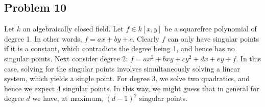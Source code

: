 \documentclass{../../mathnotes}
\begin{document}
\subsection*{Problem 10}

Let $k$ an algebraically closed field. Let $f\in k[x,y]$ be a squarefree polynomial of degree 1. In other words, $f=ax+by+c$.
Clearly $f$ can only have singular points if it is a constant, which contradicts the degree being 1, and hence has no singular points.
Next consider degree 2: $f=ax^2+bxy+cy^2+dx+ey+f$. In this case, solving for the singular points involves simultaneously solving a linear
system, which yields a single point. For degree 3, we solve two quadratics, and hence we expect 4 singular points. In this way, we might
guess that in general for degree $d$ we have, at maximum, $(d-1)^2$ singular points.
\end{document}
